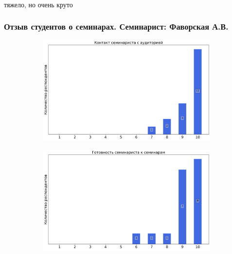             \begin{commentbox} 
                тяжело, но очень круто 
            \end{commentbox} 


    \subsubsection{Отзыв студентов о семинарах. Семинарист: Фаворская А.В.}
		\begin{figure}[H]
			\centering
			\begin{subfigure}[b]{0.45\textwidth}
				\centering
				\includegraphics[width=\textwidth]{images/3 course/Вычислительная математика/seminarists-marks-Фаворская А.В.-0.png}
			\end{subfigure}
			\begin{subfigure}[b]{0.45\textwidth}
				\centering
				\includegraphics[width=\textwidth]{images/3 course/Вычислительная математика/seminarists-marks-Фаворская А.В.-1.png}
			\end{subfigure}

\end{figure}

